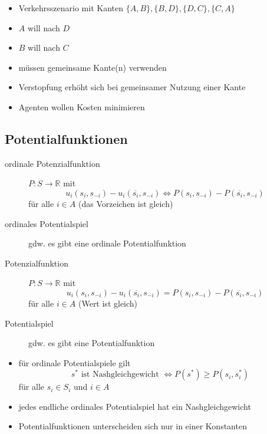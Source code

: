 \begin{itemize}
	\item Verkehrsszenario mit Kanten $\{A,B\},\{B,D\},\{D,C\},\{C,A\}$
	\item $A$ will nach $D$
	\item $B$ will nach $C$
	\item müssen gemeinsame Kante(n) verwenden
	\item Verstopfung erhöht sich bei gemeinsamer Nutzung einer Kante
	\item Agenten wollen Kosten minimieren
\end{itemize}
\subsection{Potentialfunktionen}
	\begin{description}
		\item[ordinale Potenzialfunktion] $P:S\rightarrow \mathbb{R}$ mit
			\[u_i(s_i,s_{-i})-u_i(\overline{s_i},s_{-i})\Leftrightarrow P(s_i,s_{-i})-P(\overline{s_i},s_{-i})\]
			für alle $i\in A$ (das Vorzeichen ist gleich)
		\item[ordinales Potentialspiel] gdw. es gibt eine ordinale Potentialfunktion
		\item[Potenzialfunktion] $P:S\rightarrow \mathbb{R}$ mit
			\[u_i(s_i,s_{-i})-u_i(\overline{s_i},s_{-i})= P(s_i,s_{-i})-P(\overline{s_i},s_{-i})\]
			für alle $i\in A$ (Wert ist gleich)
		\item[Potentialspiel] gdw. es gibt eine Potentialfunktion
	\end{description}
	\begin{itemize}
		\item für ordinale Potentialspiele gilt
			\[s^{*} \text{ ist Nashgleichgewicht }\Leftrightarrow P(s^{*})\geq P(s_i,s_i^{*})\]
			für alle $s_i\in S_i$ und $i\in A$
		\item jedes endliche ordinales Potentialspiel hat ein Nashgleichgewicht
		\item Potentialfunktionen unterscheiden sich nur in einer Konstanten
	\end{itemize}
